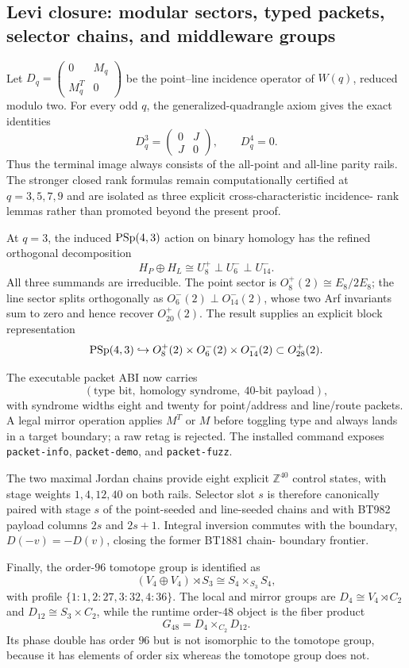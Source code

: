 \subsection{Levi closure: modular sectors, typed packets, selector chains, and middleware groups}
\label{sec:levi-closure}

Let $D_q=\left(\begin{smallmatrix}0&M_q\\M_q^T&0\end{smallmatrix}\right)$ be the
point--line incidence operator of $W(q)$, reduced modulo two. For every odd
$q$, the generalized-quadrangle axiom gives the exact identities
\[
 D_q^3=\begin{pmatrix}0&J\\J&0\end{pmatrix},\qquad D_q^4=0.
\]
Thus the terminal image always consists of the all-point and all-line parity
rails. The stronger closed rank formulas remain computationally certified at
$q=3,5,7,9$ and are isolated as three explicit cross-characteristic incidence-
rank lemmas rather than promoted beyond the present proof.

At $q=3$, the induced $\mathrm{PSp}(4,3)$ action on binary homology has the refined
orthogonal decomposition
\[
 H_P\oplus H_L\cong U_8^+\perp U_6^-\perp U_{14}^-.
\]
All three summands are irreducible. The point sector is $O_8^+(2)\cong
E_8/2E_8$; the line sector splits orthogonally as $O_6^-(2)\perp O_{14}^-(2)$,
whose two Arf invariants sum to zero and hence recover $O_{20}^+(2)$. The
result supplies an explicit block representation
\[
 \mathrm{PSp}(4,3)\hookrightarrow O_8^+(2)\times O_6^-(2)\times O_{14}^-(2)
 \subset O_{28}^+(2).
\]

The executable packet ABI now carries
\[
 (\text{type bit},\ \text{homology syndrome},\ \text{40-bit payload}),
\]
with syndrome widths eight and twenty for point/address and line/route packets.
A legal mirror operation applies $M^T$ or $M$ before toggling type and always
lands in a target boundary; a raw retag is rejected. The installed command
exposes \texttt{packet-info}, \texttt{packet-demo}, and \texttt{packet-fuzz}.

The two maximal Jordan chains provide eight explicit $\mathbb Z^{40}$ control
states, with stage weights $1,4,12,40$ on both rails. Selector slot $s$ is
therefore canonically paired with stage $s$ of the point-seeded and line-seeded
chains and with BT982 payload columns $2s$ and $2s+1$. Integral inversion
commutes with the boundary, $D(-v)=-D(v)$, closing the former BT1881 chain-
boundary frontier.

Finally, the order-$96$ tomotope group is identified as
\[
 (V_4\oplus V_4)\rtimes S_3\cong S_4\times_{S_3}S_4,
\]
with profile $\{1:1,2:27,3:32,4:36\}$. The local and mirror groups are
$D_4\cong V_4\rtimes C_2$ and $D_{12}\cong S_3\times C_2$, while the runtime
order-$48$ object is the fiber product
\[
 G_{48}=D_4\times_{C_2}D_{12}.
\]
Its phase double has order $96$ but is not isomorphic to the tomotope group,
because it has elements of order six whereas the tomotope group does not.
